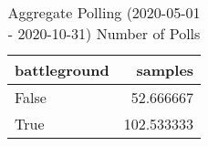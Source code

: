 \begin{table}
\centering
\caption{Aggregate Polling (2020-05-01 - 2020-10-31) Number of Polls}
\label{table:aggregate\_polling\_2020-05-01\_-\_2020-10-31\_number\_of\_polls}
\begin{tabular}{lr}
\toprule
 battleground &     samples \\
\midrule
        False &   52.666667 \\
         True &  102.533333 \\
\bottomrule
\end{tabular}
\end{table}
